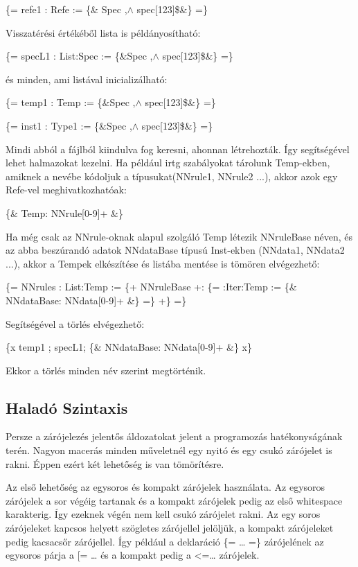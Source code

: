 \{= refe1 : Refe := \{\& Spec ,$\land$ spec[123]\$\&\} =\}

Visszatérési értékéből lista is példányosítható:

\{= specL1 : List:Spec := \{\&Spec ,$\land$ spec[123]\$\&\} =\}

és minden, ami listával inicializálható:

\{= temp1 : Temp := \{\&Spec ,$\land$ spec[123]\$\&\} =\}

\{= inst1 : Type1 := \{\&Spec ,$\land$ spec[123]\$\&\} =\}

Mindi abból a fájlból kiindulva fog keresni, ahonnan létrehozták.
Így segítségével lehet halmazokat kezelni.
Ha például irtg szabályokat tárolunk Temp-ekben, amiknek a nevébe kódoljuk a típusukat(NNrule1, NNrule2 ...),
akkor azok egy Refe-vel meghivatkozhatóak:

\{\& Temp: NNrule[0-9]+ \&\}

Ha még csak az NNrule-oknak alapul szolgáló Temp létezik NNruleBase néven, 
és az abba beszúrandó adatok  NNdataBase típusú Inst-ekben (NNdata1, NNdata2 ...),
akkor a Tempek elkészítése és listába mentése is tömören elvégezhető:

\{= NNrules : List:Temp := \{+ NNruleBase +: \{= :Iter:Temp := \{\& NNdataBase: NNdata[0-9]+ \&\} =\} +\} =\}

Segítségével a törlés elvégezhető:

\{x temp1 ; specL1; \{\& NNdataBase: NNdata[0-9]+ \&\} x\}

Ekkor a törlés minden név szerint megtörténik.


\subsection{Haladó Szintaxis}
Persze a zárójelezés jelentős áldozatokat jelent a programozás hatékonyságának terén. 
Nagyon macerás minden műveletnél egy nyitó és egy csukó zárójelet is rakni. 
Éppen ezért két lehetőség is van tömörítésre.

Az első lehetőség az egysoros és kompakt zárójelek használata. 
Az egysoros zárójelek a sor végéig tartanak és a kompakt zárójelek pedig az első whitespace karakterig. 
Így ezeknek végén nem kell csukó zárójelet rakni. 
Az egy soros zárójeleket kapcsos helyett szögletes zárójellel jelöljük, a kompakt zárójeleket pedig kacsacsőr zárójellel. 
Így például a deklaráció \{= … =\} zárójelének az egysoros párja a [= … és a kompakt pedig a <=… zárójelek.

